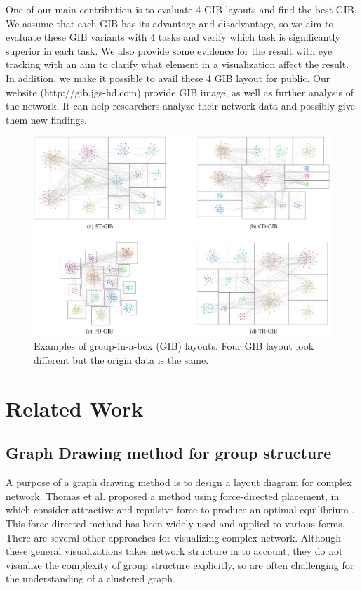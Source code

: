 \documentclass{vgtc}                          %
\begin{document}
One of our main contribution is to evaluate 4 GIB layouts and find the best GIB.
We assume that each GIB has its advantage and disadvantage, so we aim to evaluate these GIB variants with 4 tasks and verify which task is significantly superior in each task.
We also provide some evidence for the result with eye tracking with an aim to clarify what element in a visualization affect the result.
In addition, we make it possible to avail these 4 GIB layout for public. Our website (http://gib.jgs-hd.com) provide GIB image, as well as further analysis of the network. It can help researchers analyze their network data and possibly give them new findings.

\begin{figure}[t]
  \begin{center}
    \includegraphics[width=1\textwidth]{pictures/examples.png}
    \caption{Examples of group-in-a-box (GIB) layouts. Four GIB layout look different but the origin data is the same.}
    \label{GIB-examples}
  \end{center}
\end{figure}

%
\section{Related Work}
%
\subsection{Graph Drawing method for group structure}
A purpose of a graph drawing method is to design a layout diagram for complex network. Thomas et al. proposed a method using force-directed placement, in which consider attractive and repulsive force to produce an optimal equilibrium \cite{fruchterman1991graph}. This force-directed method has been widely used and applied to various forms. There are several other approaches \cite{harel2000fast,koren2003drawing,hachul2004drawing,article} for visualizing complex network. Although these general visualizations takes network structure in to account, they do not visualize the complexity of group structure explicitly, so are often challenging for the understanding of a clustered graph. 
\end{document}
